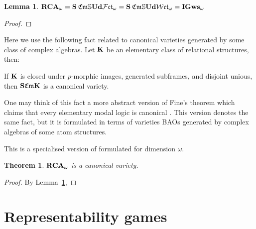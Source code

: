 \documentclass[a4paper]{article}
\theoremstyle{defin}
\theoremstyle{theorem}
\newtheorem{theorem}{Theorem}
\theoremstyle{prop}
\theoremstyle{lemma}
\newtheorem{lemma}{Lemma}
\theoremstyle{fact}
\theoremstyle{ex}
\theoremstyle{col}
\begin{document}
\begin{lemma} \label{rcachar}
${\bf RCA}_{\omega} = {\bf S} \: \mathfrak{Cm} \mathbb{S} {\bf Ud} \mathcal{F} \mathfrak{ct}_{\omega} = {\bf S} \: \mathfrak{Cm} \mathbb{S} {\bf Ud} \mathcal{W} \mathfrak{ct}_{\omega} = {\bf IGws}_{\omega}$
\end{lemma}

\begin{proof}

\end{proof}

Here we use the following fact related to canonical varieties generated by some class of complex algebras. Let ${\bf K}$ be an elementary class of relational structures, then:
\begin{center}
If ${\bf K}$ is closed under $p$-morphic images, generated subframes, and disjoint unious, \\ then ${\bf S} \mathfrak{Cm} {\bf K}$ is a canonical variety.
\end{center}
One may think of this fact a more abstract version of Fine's theorem which claims that every elementary modal logic is canonical \cite{fine1975some}. This version denotes the same fact, but it is formulated in terms of varieties BAOs generated by complex algebras of some atom structures.

This is a specialised version of \cite[Theorem 4.4]{goldblatt1995elementary} formulated for dimension $\omega$.

\begin{theorem}
${\bf RCA}_{\omega}$ is a canonical variety.
\end{theorem}

\begin{proof}
By Lemma~\ref{rcachar},
\end{proof}

\section{Representability games}



\end{document}
